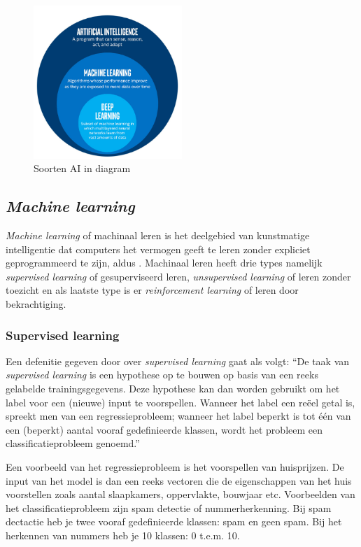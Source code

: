 \begin{figure}
    \centering
    \includegraphics[width=0.5\textwidth]{./img/ai_fields.png}
    \caption{\label{fig:soorten_ai_diagram} Soorten AI in diagram \autocite{Bansal2019}}
\end{figure}

\subsection{\textit{Machine learning}}
\textit{Machine learning} of machinaal leren is het deelgebied van kunstmatige intelligentie dat computers het vermogen geeft te leren zonder expliciet geprogrammeerd te zijn, aldus \textcite{Lievens2021}. Machinaal leren heeft drie types namelijk \textit{supervised learning} of gesuperviseerd leren, \textit{unsupervised learning} of leren zonder toezicht en als laatste type is er \textit{reinforcement learning} of leren door bekrachtiging.

\subsubsection{Supervised learning}
Een defenitie gegeven door \textcite{Lievens2021} over \textit{supervised learning} gaat als volgt: ``De taak van \textit{supervised learning} is een hypothese op te bouwen op basis van een reeks gelabelde trainingsgegevens. Deze hypothese kan dan worden gebruikt om het label voor een (nieuwe) input te voorspellen. Wanneer het label een reëel getal is, spreekt men van een regressieprobleem; wanneer het label beperkt is tot één van een (beperkt) aantal vooraf gedefinieerde klassen, wordt het probleem een classificatieprobleem genoemd.''

Een voorbeeld van het regressieprobleem is het voorspellen van huisprijzen. De input van het model is dan een reeks vectoren die de eigenschappen van het huis voorstellen zoals aantal slaapkamers, oppervlakte, bouwjaar etc.
Voorbeelden van het classificatieprobleem zijn spam detectie of nummerherkenning. Bij spam dectactie heb je twee vooraf gedefinieerde klassen: spam en geen spam. Bij het herkennen van nummers heb je 10 klassen: 0 t.e.m. 10.

